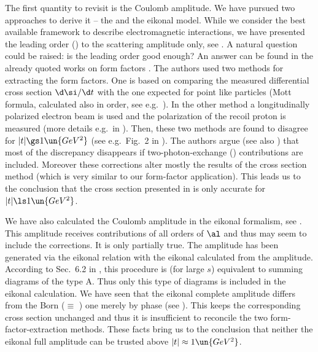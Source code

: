 The first quantity to revisit is the Coulomb amplitude. We have pursued two approaches to derive it -- the  and the eikonal model. While we consider  the best available framework to describe electromagnetic interactions, we have presented the leading order () to the scattering amplitude only, see . A natural question could be raised: is the leading order good enough? An answer can be found in the already quoted works on form factors . The authors used two methods for extracting the form factors. One is based on comparing the measured differential cross section $\d\si/\d t$ with the one expected for point like particles (Mott formula, calculated also in  order, see e.g.~). In the other method a longitudinally polarized electron beam is used and the polarization of the recoil proton is measured (more details e.g.~in ). Then, these two methods are found to disagree for $|t| \gs 1\un{GeV^2}$ (see e.g.~Fig.~2 in ). The authors argue (see also ) that most of the discrepancy disappears if two-photon-exchange () contributions are included. Moreover these corrections alter mostly the results of the cross section method (which is very similar to our form-factor application). This leads us to the conclusion that the  cross section presented in  is only accurate for $|t| \ls 1\un{GeV^2}$.

We have also calculated the Coulomb amplitude in the eikonal formalism, see . This amplitude receives contributions of all orders of $\al$ and thus may seem to include the  corrections. It is only partially true. The amplitude has been generated via the eikonal relation  with the eikonal calculated from the  amplitude. According to Sec.~6.2 in , this procedure is (for large $s$) equivalent to summing diagrams of the type  A. Thus only this type of diagrams is included in the eikonal calculation. We have seen that the eikonal complete amplitude differs from the Born ($\equiv$ ) one merely by phase (see ). This keeps the corresponding cross section unchanged and thus it is insufficient to reconcile the two form-factor-extraction methods. These facts bring us to the conclusion that neither the eikonal full amplitude can be trusted above $|t|\approx 1\un{GeV^2}$.


